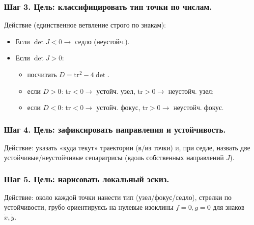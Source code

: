\subsubsection{Шаг 3. Цель: классифицировать тип точки по числам.}
Действие (единственное ветвление строго по знакам):
\begin{itemize}
    \item Если $\det J < 0 \to$ седло (неустойч.).
    \item Если $\det J > 0$:
    \begin{itemize}
        \item посчитать $D = \text{tr}^2 - 4 \det$.
        \item если $D > 0$: $\text{tr} < 0 \to$ устойч. узел, $\text{tr} > 0 \to$ неустойч. узел;
        \item если $D < 0$: $\text{tr} < 0 \to$ устойч. фокус, $\text{tr} > 0 \to$ неустойч. фокус.
    \end{itemize}
\end{itemize}

\subsubsection{Шаг 4. Цель: зафиксировать направления и устойчивость.}
Действие: указать «куда текут» траектории (в/из точки) и, при седле, назвать две устойчивые/неустойчивые сепаратрисы (вдоль собственных направлений $J$).

\subsubsection{Шаг 5. Цель: нарисовать локальный эскиз.}
Действие: около каждой точки нанести тип (узел/фокус/седло), стрелки по устойчивости, грубо ориентируясь на нулевые изоклины $f = 0, g = 0$ для знаков $\dot{x}, \dot{y}$.

